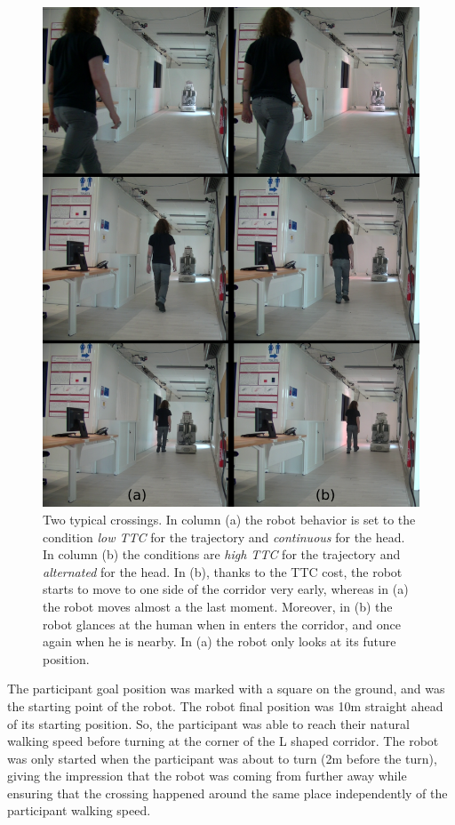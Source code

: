 \documentclass[a4paper,11pt,twoside]{StyleThese}
\begin{document}
\begin{figure}[hbtp]
\centering
\includegraphics[width=\textwidth]{figures/chapter2/Chap2ExpeReal.png}
\caption{Two typical crossings. In column (a) the robot behavior is set to the condition \textit{low TTC} for the trajectory and \textit{continuous} for the head. In column (b) the conditions are \textit{high TTC} for the trajectory and \textit{alternated} for the head. In (b), thanks to the TTC cost, the robot starts to move to one side of the corridor very early, whereas in (a) the robot moves almost a the last moment. Moreover, in (b) the robot glances at the human when in enters the corridor, and once again when he is nearby. In (a) the robot only looks at its future position.}
\label{fig:realttc}
\end{figure}

The participant goal position was marked with a square on the ground, and was the starting point of the robot. The robot final position was 10m straight ahead of its starting position. So, the participant was able to reach their natural walking speed before turning at the corner of the L shaped corridor. The robot was only started when the participant was about to turn (2m before the turn), giving the impression that the robot was coming from further away while ensuring that the crossing happened around the same place independently of the participant walking speed.
\end{document}
